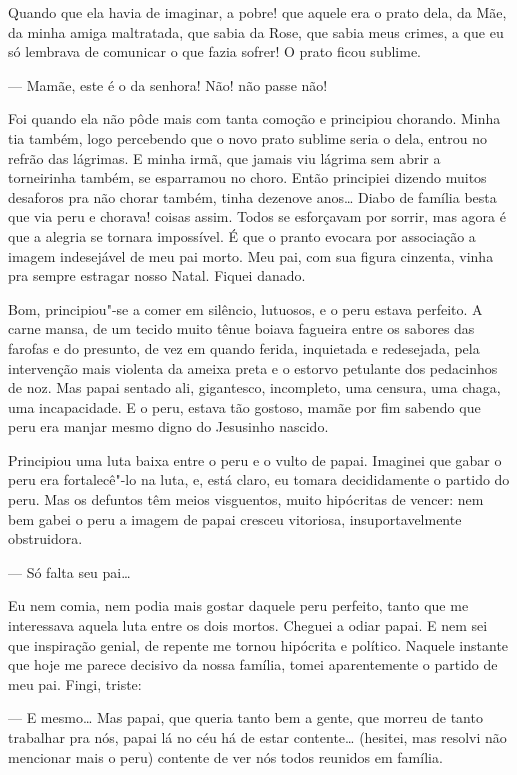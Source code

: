 \begin{linenumbers}
Quando que ela havia de imaginar, a pobre! que aquele era o prato dela,
da Mãe, da minha amiga maltratada, que sabia da Rose, que sabia meus
crimes, a que eu só lembrava de comunicar o que fazia sofrer! O prato
ficou sublime.

--- Mamãe, este é o da senhora! Não! não passe não!

Foi quando ela não pôde mais com tanta comoção e principiou chorando.
Minha tia também, logo percebendo que o novo prato sublime seria o dela,
entrou no refrão das lágrimas. E minha irmã, que jamais viu lágrima sem
abrir a torneirinha também, se esparramou no choro. Então principiei
dizendo muitos desaforos pra não chorar também, tinha dezenove anos\ldots{}
Diabo de família besta que via peru e chorava! coisas assim. Todos se
esforçavam por sorrir, mas agora é que a alegria se tornara impossível.
É que o pranto evocara por associação a imagem indesejável de meu pai
morto. Meu pai, com sua figura cinzenta, vinha pra sempre estragar nosso
Natal. Fiquei danado.

Bom, principiou"-se a comer em silêncio, lutuosos, e o peru estava
perfeito. A carne mansa, de um tecido muito tênue boiava fagueira entre
os sabores das farofas e do presunto, de vez em quando ferida,
inquietada e redesejada, pela intervenção mais violenta da ameixa preta
e o estorvo petulante dos pedacinhos de noz. Mas papai sentado ali,
gigantesco, incompleto, uma censura, uma chaga, uma incapacidade. E o
peru, estava tão gostoso, mamãe por fim sabendo que peru era manjar
mesmo digno do Jesusinho nascido.

Principiou uma luta baixa entre o peru e o vulto de papai. Imaginei que
gabar o peru era fortalecê"-lo na luta, e, está claro, eu tomara
decididamente o partido do peru. Mas os defuntos têm meios visguentos,
muito hipócritas de vencer: nem bem gabei o peru a imagem de papai
cresceu vitoriosa, insuportavelmente obstruidora.

--- Só falta seu pai\ldots{}

Eu nem comia, nem podia mais gostar daquele peru perfeito, tanto que me
interessava aquela luta entre os dois mortos. Cheguei a odiar papai. E
nem sei que inspiração genial, de repente me tornou hipócrita e
político. Naquele instante que hoje me parece decisivo da nossa família,
tomei aparentemente o partido de meu pai. Fingi, triste:

--- E mesmo\ldots{} Mas papai, que queria tanto bem a gente, que morreu de
tanto trabalhar pra nós, papai lá no céu há de estar contente\ldots{}
(hesitei, mas resolvi não mencionar mais o peru) contente de ver nós
todos reunidos em família.


\end{linenumbers}
